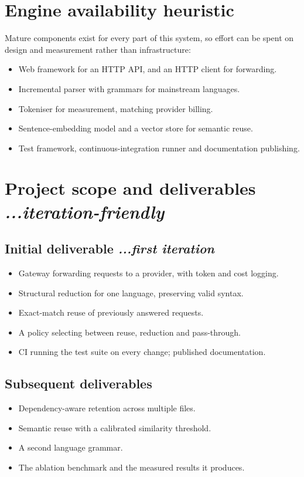 \documentclass[11pt,a4paper]{article}
\newcommand{\BvrHint}[1]{%
  {\normalfont\normalsize\itshape\hfill #1}}
\begin{document}
\section{Engine availability heuristic}

Mature components exist for every part of this system, so effort can be spent on
design and measurement rather than infrastructure:

\begin{itemize}[noitemsep]
  \item Web framework for an HTTP API, and an HTTP client for forwarding.
  \item Incremental parser with grammars for mainstream languages.
  \item Tokeniser for measurement, matching provider billing.
  \item Sentence-embedding model and a vector store for semantic reuse.
  \item Test framework, continuous-integration runner and documentation
        publishing.
\end{itemize}

\section{Project scope and deliverables \BvrHint{...iteration-friendly}}

\subsection{Initial deliverable \BvrHint{...first iteration}}
\begin{itemize}[noitemsep]
  \item Gateway forwarding requests to a provider, with token and cost logging.
  \item Structural reduction for one language, preserving valid syntax.
  \item Exact-match reuse of previously answered requests.
  \item A policy selecting between reuse, reduction and pass-through.
  \item CI running the test suite on every change; published documentation.
\end{itemize}

\subsection{Subsequent deliverables}
\begin{itemize}[noitemsep]
  \item Dependency-aware retention across multiple files.
  \item Semantic reuse with a calibrated similarity threshold.
  \item A second language grammar.
  \item The ablation benchmark and the measured results it produces.
\end{itemize}
\end{document}
